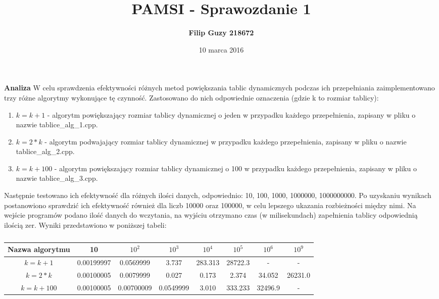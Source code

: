 \documentclass[10pt, a4paper]{article}
\title{\textbf{PAMSI - Sprawozdanie 1}}
\author{\textbf{Filip Guzy 218672}}
\date{10 marca 2016}
\begin{document}
\maketitle

\begin{flushleft}
\textbf{Analiza} \newline \newline
W celu sprawdzenia efektywności różnych metod powiększania tablic dynamicznych podczas ich przepełniania zaimplementowano trzy różne algorytmy wykonujące tę czynność. Zastosowano do nich odpowiednie oznaczenia (gdzie k to rozmiar tablicy): 
\begin{enumerate}
\item $k=k+1$ - algorytm powiększający rozmiar tablicy dynamicznej o jeden w przypadku każdego przepełnienia, zapisany w pliku o nazwie tablice\_alg\_1.cpp. 
\item $k=2*k$ - algorytm podwajający rozmiar tablicy dynamicznej w przypadku każdego przepełnienia, zapisany w pliku o nazwie tablice\_alg\_2.cpp.
\item $k=k+100$ - algorytm powiększający rozmiar tablicy dynamicznej o 100 w przypadku każdego przepełnienia, zapisany w pliku o nazwie tablice\_alg\_3.cpp.
\end{enumerate}

Następnie testowano ich efektywność dla różnych ilości danych, odpowiednio: 10, 100, 1000, 1000000, 1000000000. Po uzyskaniu wynikach postanowiono sprawdzić ich efektywność również dla liczb 10000 oraz 100000, w celu lepszego ukazania rozbieżności między nimi. Na wejście programów podano ilość danych do wczytania, na wyjściu otrzymano czas (w milisekundach) zapełnienia tablicy odpowiednią ilością zer. Wyniki przedstawiono w poniższej tabeli:

\begin{table}[h]
\centering
\caption{}
\begin{tabular}{|c|c|c|c|c|c|c|c|} \hline
Nazwa algorytmu & 10 & $10^2$ & $10^3$ & $10^4$ & $10^5$ & $10^6$ & $10^9$ \\ \hline
$k=k+1$ & 0.00199997 & 0.0569999 & 3.737 & 283.313 & 28722.3 & - & - \\ \hline
$k=2*k$ & 0.00100005 & 0.0079999 & 0.027 & 0.173 & 2.374 & 34.052 & 26231.0 \\ \hline
$k=k+100$ & 0.00100005 & 0.00700009 & 0.0549999 & 3.010 & 333.233 & 32496.9 & - \\ \hline
\end{tabular}
\end{table}


\end{flushleft}
\end{document}
